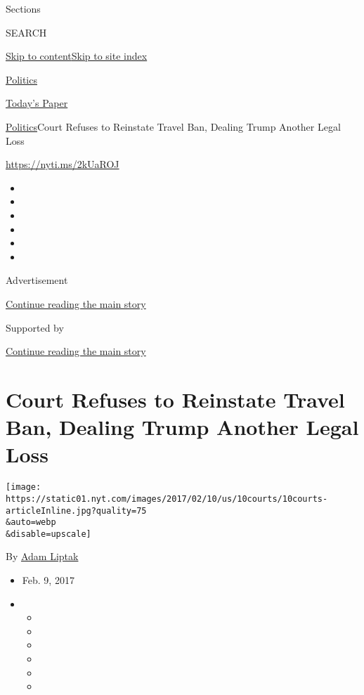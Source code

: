 Sections

SEARCH

\protect\hyperlink{site-content}{Skip to
content}\protect\hyperlink{site-index}{Skip to site index}

\href{https://www.nytimes.com/section/politics}{Politics}

\href{https://myaccount.nytimes.com/auth/login?response_type=cookie\&client_id=vi}{}

\href{https://www.nytimes.com/section/todayspaper}{Today's Paper}

\href{/section/politics}{Politics}\textbar{}Court Refuses to Reinstate
Travel Ban, Dealing Trump Another Legal Loss

\url{https://nyti.ms/2kUaROJ}

\begin{itemize}
\item
\item
\item
\item
\item
\item
\end{itemize}

Advertisement

\protect\hyperlink{after-top}{Continue reading the main story}

Supported by

\protect\hyperlink{after-sponsor}{Continue reading the main story}

\hypertarget{court-refuses-to-reinstate-travel-ban-dealing-trump-another-legal-loss}{%
\section{Court Refuses to Reinstate Travel Ban, Dealing Trump Another
Legal
Loss}\label{court-refuses-to-reinstate-travel-ban-dealing-trump-another-legal-loss}}

\texttt{[image: https://static01.nyt.com/images/2017/02/10/us/10courts/10courts-articleInline.jpg?quality=75\\\&auto=webp\\\&disable=upscale]}

By \href{http://www.nytimes.com/by/adam-liptak}{Adam Liptak}

\begin{itemize}
\item
  Feb. 9, 2017
\item
  \begin{itemize}
  \item
  \item
  \item
  \item
  \item
  \item
  \end{itemize}
\end{itemize}


